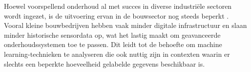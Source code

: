 Hoewel voorspellend onderhoud al met succes in diverse industriële sectoren wordt ingezet, is de uitvoering ervan in de bouwsector nog steeds beperkt \autocite{Mikulic2024}. Vooral kleine bouwbedrijven hebben vaak minder digitale infrastructuur en slaan minder historische sensordata op, wat het lastig maakt om geavanceerde onderhoudssystemen toe te passen. Dit leidt tot de behoefte om  machine learning-technieken te analyseren die ook nuttig zijn in contexten waarin er slechts een beperkte hoeveelheid gelabelde gegevens beschikbaar is.


\section{}%

